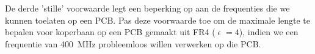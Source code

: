 De derde 'stille' voorwaarde legt een beperking op aan de frequenties die we kunnen toelaten op een PCB. Pas deze voorwaarde toe om de maximale lengte te bepalen voor koperbaan op een PCB gemaakt uit FR4 ($\mitvarepsilon = 4$), indien we een frequentie van \qty {400}{\mega \hertz } probleemloos willen verwerken op die PCB.
